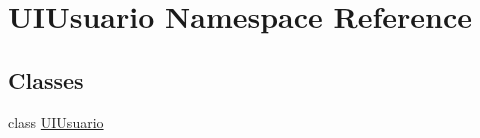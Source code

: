 \hypertarget{namespace_u_i_usuario}{}\section{U\+I\+Usuario Namespace Reference}
\label{namespace_u_i_usuario}
\subsection*{Classes}
\begin{DoxyCompactItemize}
\item 
class \mbox{\hyperlink{class_u_i_usuario_1_1_u_i_usuario}{U\+I\+Usuario}}
\end{DoxyCompactItemize}
